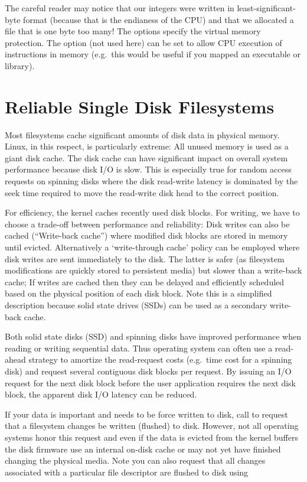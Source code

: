 The careful reader may notice that our integers were written in least-significant-byte format (because that is the endianess of the CPU) and that we allocated a file that is one byte too many! The  options specify the virtual memory protection. The option  (not used here) can be set to allow CPU execution of instructions in memory (e.g.~this would be useful if you mapped an executable or library).

\section{Reliable Single Disk Filesystems}

Most filesystems cache significant amounts of disk data in physical memory. Linux, in this respect, is particularly extreme: All unused memory is used as a giant disk cache. The disk cache can have significant impact on overall system performance because disk I/O is slow. This is especially true for random access requests on spinning disks where the disk read-write latency is dominated by the seek time required to move the read-write disk head to the correct position.

For efficiency, the kernel caches recently used disk blocks. For writing, we have to choose a trade-off between performance and reliability: Disk writes can also be cached (``Write-back cache'') where modified disk blocks are stored in memory until evicted. Alternatively a `write-through cache' policy can be employed where disk writes are sent immediately to the disk. The latter is safer (as filesystem modifications are quickly stored to persistent media) but slower than a write-back cache; If writes are cached then they can be delayed and efficiently scheduled based on the physical position of each disk block. Note this is a simplified description because solid state drives (SSDs) can be used as a secondary write-back cache.

Both solid state disks (SSD) and spinning disks have improved performance when reading or writing sequential data. Thus operating system can often use a read-ahead strategy to amortize the read-request costs (e.g.~time cost for a spinning disk) and request several contiguous disk blocks per request. By issuing an I/O request for the next disk block before the user application requires the next disk block, the apparent disk I/O latency can be reduced.

If your data is important and needs to be force written to disk, call  to request that a filesystem changes be written (flushed) to disk. However, not all operating systems honor this request and even if the data is evicted from the kernel buffers the disk firmware use an internal on-disk cache or may not yet have finished changing the physical media. Note you can also request that all changes associated with a particular file descriptor are flushed to disk using 

